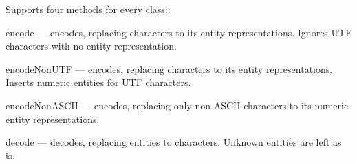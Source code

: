 Supports four methods for every class\+:


\begin{DoxyItemize}
\item encode — encodes, replacing characters to its entity representations. Ignores U\+TF characters with no entity representation.
\item encode\+Non\+U\+TF — encodes, replacing characters to its entity representations. Inserts numeric entities for U\+TF characters.
\item encode\+Non\+A\+S\+C\+II — encodes, replacing only non-\/\+A\+S\+C\+II characters to its numeric entity representations.
\item decode — decodes, replacing entities to characters. Unknown entities are left as is. 
\end{DoxyItemize}
